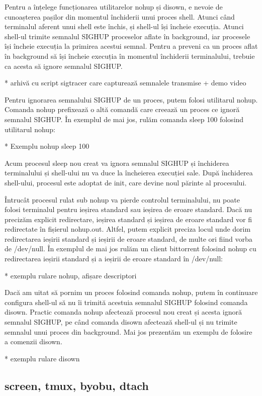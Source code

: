 Pentru a înțelege funcționarea utilitarelor nohup și disown, e nevoie de
cunoașterea pașilor din momentul închiderii unui proces shell. Atunci când
terminalul aferent unui shell este închis, și shell-ul își încheie execuția.
Atunci shell-ul trimite semnalul SIGHUP proceselor aflate în background, iar
procesele își încheie execuția la primirea acestui semnal. Pentru a preveni ca
un proces aflat în background să își încheie execuția în momentul închiderii
terminalului, trebuie ca acesta să ignore semnalul SIGHUP.

* arhivă cu script sigtracer care capturează semnalele transmise + demo video

Pentru ignorarea semnalului SIGHUP de un proces, putem folosi utilitarul nohup.
Comanda nohup prefixează o altă comandă care creează un proces ce ignoră
semnalul SIGHUP. În exemplul de mai jos, rulăm comanda sleep 100 folosind
utilitarul nohup:

* Exemplu nohup sleep 100

Acum procesul sleep nou creat va ignora semnalul SIGHUP și închiderea
terminalului și shell-ului nu va duce la încheierea execuției sale. După
închiderea shell-ului, procesul este adoptat de init, care devine noul părinte
al procesului.

Întrucât procesul rulat sub nohup va pierde controlul terminalului, nu poate
folosi terminalul pentru ieșirea standard sau ieșirea de eroare standard. Dacă
nu precizăm explicit redirectare, ieșirea standard și ieșirea de eroare standard
vor fi redirectate în fișierul nohup.out. Altfel, putem explicit preciza locul
unde dorim redirectarea ieșirii standard și ieșirii de eroare standard, de multe
ori fiind vorba de /dev/null. În exemplul de mai jos rulăm un client bittorrent
folosind nohup cu redirectarea ieșirii standard și a ieșirii de eroare standard
în /dev/null:

* exemplu rulare nohup, afișare descriptori

Dacă am uitat să pornim un proces folosind comanda nohup, putem în continuare
configura shell-ul să nu îi trimită acestuia semnalul SIGHUP folosind comanda
disown. Practic comanda nohup afectează procesul nou creat și acesta ignoră
semnalul SIGHUP, pe când comanda disown afectează shell-ul și nu trimite
semnalul unui proces din background. Mai jos prezentăm un exemplu de folosire a
comenzii disown.

* exemplu rulare disown

\subsection{screen, tmux, byobu, dtach}
\label{sec:procese-interactivitate-screen}

